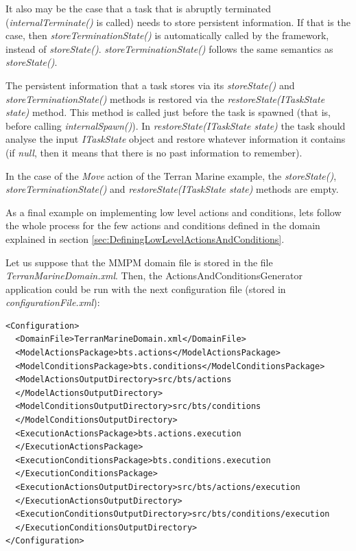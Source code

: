 \documentclass[a4paper]{article}
\begin{document}
It also may be the case that a task that is abruptly terminated (\textit{internalTerminate()} is called) needs to store persistent information. If that is the case, then \textit{storeTerminationState()} is automatically called by the framework, instead of \textit{storeState()}. \textit{storeTerminationState()} follows the same semantics as \textit{storeState()}.

The persistent information that a task stores via its \textit{storeState()} and \textit{storeTerminationState()} methods is restored via the \textit{restoreState(ITaskState state)} method. This method is called just before the task is spawned (that is, before calling \textit{internalSpawn()}). In \textit{restoreState(ITaskState state)} the task should analyse the input \textit{ITaskState} object and restore whatever information it contains (if \textit{null}, then it means that there is no past information to remember).

In the case of the \textit{Move} action of the Terran Marine example, the \textit{storeState()}, \textit{storeTerminationState()} and \textit{restoreState(ITaskState state)} methods are empty.

As a final example on implementing low level actions and conditions, lets follow the whole process for the few actions and conditions defined in the domain explained in section \ref{sec:DefiningLowLevelActionsAndConditions}.

Let us suppose that the MMPM domain file is stored in the file \textit{TerranMarineDomain.xml}. Then, the ActionsAndConditionsGenerator application could be run with the next configuration file (stored in \textit{configurationFile.xml}):

\begin{verbatim}
<Configuration> 
  <DomainFile>TerranMarineDomain.xml</DomainFile>
  <ModelActionsPackage>bts.actions</ModelActionsPackage>
  <ModelConditionsPackage>bts.conditions</ModelConditionsPackage>
  <ModelActionsOutputDirectory>src/bts/actions
  </ModelActionsOutputDirectory>
  <ModelConditionsOutputDirectory>src/bts/conditions
  </ModelConditionsOutputDirectory>
  <ExecutionActionsPackage>bts.actions.execution
  </ExecutionActionsPackage>
  <ExecutionConditionsPackage>bts.conditions.execution
  </ExecutionConditionsPackage>
  <ExecutionActionsOutputDirectory>src/bts/actions/execution
  </ExecutionActionsOutputDirectory>
  <ExecutionConditionsOutputDirectory>src/bts/conditions/execution
  </ExecutionConditionsOutputDirectory>
</Configuration>
\end{verbatim}
\end{document}
